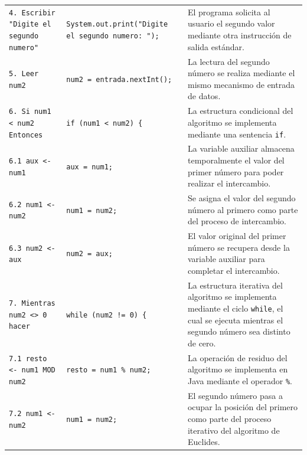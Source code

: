 \documentclass[12pt,twoside]{book}
\begin{document}
\begin{landscape}
\begin{longtable}{p{6cm} p{6cm} p{7.5cm}}
							\texttt{4. Escribir "Digite el segundo numero"}
							&
							\texttt{System.out.print("Digite el segundo numero: ");}
							&
							El programa solicita al usuario el segundo valor mediante otra instrucción de salida estándar. \\
							
							\texttt{5. Leer num2}
							&
							\texttt{num2 = entrada.nextInt();}
							&
							La lectura del segundo número se realiza mediante el mismo mecanismo de entrada de datos. \\
							
							
							\texttt{6. Si num1 < num2 Entonces}
							&
							\texttt{if (num1 < num2) \{}
							&
							La estructura condicional del algoritmo se implementa mediante una sentencia \texttt{if}. \\
				
							\texttt{6.1 aux <- num1}
							&
							\texttt{aux = num1;}
							&
							La variable auxiliar almacena temporalmente el valor del primer número para poder realizar el intercambio. \\
							
							
							\texttt{6.2 num1 <- num2}
							&
							\texttt{num1 = num2;}
							&
							Se asigna el valor del segundo número al primero como parte del proceso de intercambio. \\
							
							
							\texttt{6.3 num2 <- aux}
							&
							\texttt{num2 = aux;}
							&
							El valor original del primer número se recupera desde la variable auxiliar para completar el intercambio. \\
							
							\texttt{7. Mientras num2 <> 0 hacer}
							&
							\texttt{while (num2 != 0) \{}
							&
							La estructura iterativa del algoritmo se implementa mediante el ciclo \texttt{while}, el cual se ejecuta mientras el segundo número sea distinto de cero. \\
							
							\texttt{7.1 resto <- num1 MOD num2}
							&
							\texttt{resto = num1 \% num2;}
							&
							La operación de residuo del algoritmo se implementa en Java mediante el operador \texttt{\%}. \\
							
							
							\texttt{7.2 num1 <- num2}
							&
							\texttt{num1 = num2;}
							&
							El segundo número pasa a ocupar la posición del primero como parte del proceso iterativo del algoritmo de Euclides. \\
							

\end{longtable}
\end{landscape}
\end{document}

